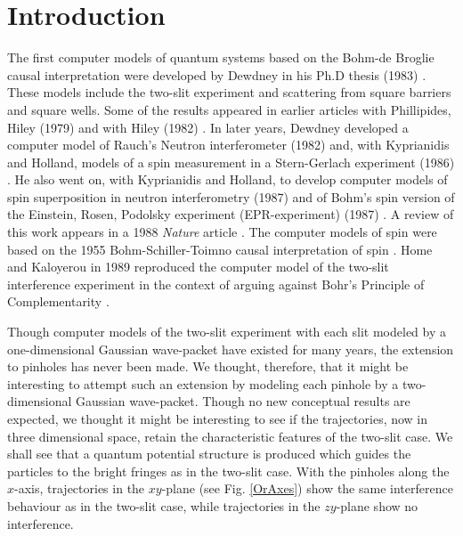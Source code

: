 \documentclass[12pt]{article}       %
\begin{document}
\section{Introduction\label{intro}}
The  first computer models of quantum systems based on the Bohm-de Broglie causal interpretation \cite{B52,DEBR60} were developed by Dewdney in his  Ph.D thesis (1983) \cite{DEWD83}. These models include the two-slit experiment and scattering from square barriers and square wells.  Some of the results appeared in earlier articles  with Phillipides, Hiley (1979)  \cite{DEWD79} and with  Hiley (1982) \cite{DEWD82}. In later years,  Dewdney developed a computer model of Rauch's Neutron interferometer (1982) \cite{DEWD85} and,  with  Kyprianidis and Holland,  models of  a spin measurement in a Stern-Gerlach experiment (1986) \cite{DEWD86}. He also went on, with  Kyprianidis and Holland, to develop computer models of spin superposition in neutron interferometry   (1987) \cite{DEWD87} and  of Bohm's spin version of the Einstein, Rosen, Podolsky experiment (EPR-experiment) (1987) \cite{DEWDEPR87}. A review of this work appears in a 1988 {\it Nature} article  \cite{DEWD88}. The computer models of spin were based on the 1955 Bohm-Schiller-Toimno causal interpretation of spin \cite{BST55}. Home and Kaloyerou in 1989 reproduced the computer model of the two-slit interference experiment \cite{K89} in the context of arguing against  Bohr's Principle of Complementarity \cite{BR28}. 

Though computer models of the two-slit experiment with each slit modeled by a  one-dimensional Gaussian wave-packet have existed for many years, the extension to pinholes has never been made. We thought, therefore, that it might be interesting to attempt such an extension by modeling each pinhole by a two-dimensional Gaussian wave-packet. Though no new conceptual results are expected, we thought it might be interesting to see if the trajectories, now in three dimensional space, retain the characteristic features of the two-slit case. We shall see that a quantum potential structure is produced which guides the particles to the bright fringes as in the two-slit case. With the pinholes along the $x$-axis, trajectories in the $xy$-plane  (see Fig. \ref{OrAxes}) show the same interference behaviour as in the two-slit case, while trajectories in the $zy$-plane show no interference.
\end{document}

